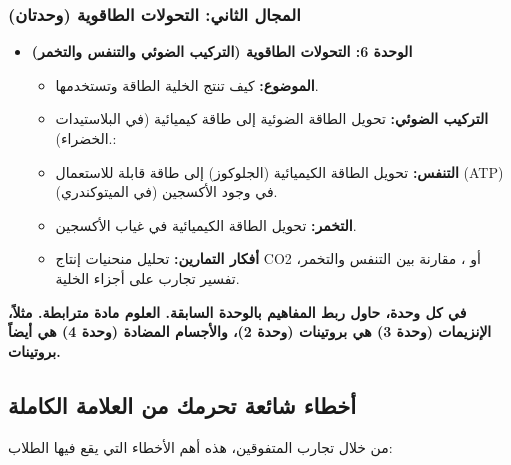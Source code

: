 \documentclass[12pt,a4paper]{book}
\newcommand{\importantAr}[1]{%
	\begin{important}
		\bfseries #1
	\end{important}
}
\begin{document}
	\subsubsection*{المجال الثاني: التحولات الطاقوية (وحدتان)}
	\begin{itemize}
		\item \textbf{الوحدة 6: التحولات الطاقوية (التركيب الضوئي والتنفس والتخمر)}
		\begin{itemize}
			\item \textbf{الموضوع:} كيف تنتج الخلية الطاقة وتستخدمها.
			\item \textbf{التركيب الضوئي:} تحويل الطاقة الضوئية إلى طاقة كيميائية (في البلاستيدات الخضراء).: 
			\item \textbf{التنفس:} تحويل الطاقة الكيميائية (الجلوكوز) إلى طاقة قابلة للاستعمال (ATP) في وجود الأكسجين (في الميتوكندري).
			\item \textbf{التخمر:} تحويل الطاقة الكيميائية في غياب الأكسجين.
			\item \textbf{أفكار التمارين:} تحليل منحنيات إنتاج CO2 أو ، مقارنة بين التنفس والتخمر، تفسير تجارب على أجزاء الخلية.
		\end{itemize}
	\end{itemize}
	
	\importantAr{في كل وحدة، حاول ربط المفاهيم بالوحدة السابقة. العلوم مادة مترابطة. مثلاً، الإنزيمات (وحدة 3) هي بروتينات (وحدة 2)، والأجسام المضادة (وحدة 4) هي أيضاً بروتينات.}
	
	\subsection{أخطاء شائعة تحرمك من العلامة الكاملة }
	من خلال تجارب المتفوقين، هذه أهم الأخطاء التي يقع فيها الطلاب:
	
\end{document}
